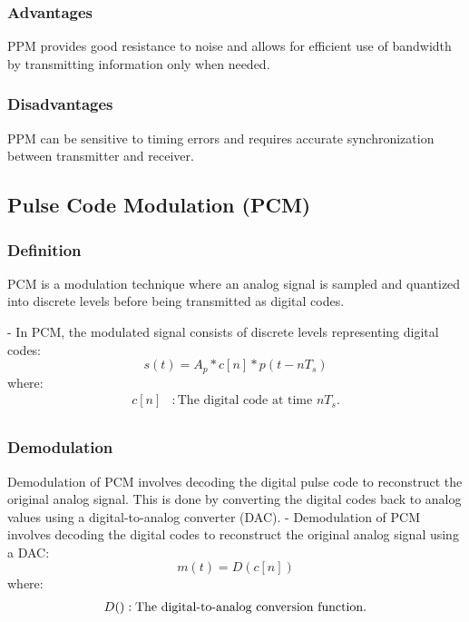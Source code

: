\documentclass{IEEEtran}
\begin{document}
	\subsubsection{Advantages}
	PPM provides good resistance to noise and allows for efficient use of bandwidth by transmitting information only when needed.
	
	\subsubsection{Disadvantages}
	PPM can be sensitive to timing errors and requires accurate synchronization between transmitter and receiver.
	
	\subsection{Pulse Code Modulation (PCM)}
	
	\subsubsection{Definition}
	PCM is a modulation technique where an analog signal is sampled and quantized into discrete levels before being transmitted as digital codes.
	
	 - In PCM, the modulated signal consists of discrete levels representing digital codes:
	\begin{equation}
		s(t) = A_p * c[n] * p(t - nT_s)
	\end{equation}
	where: \\
	\begin{align*}
		c[n]  & : \text{The digital code at time $nT_s$.} \\
	\end{align*}
	
	\subsubsection{Demodulation}
	 Demodulation of PCM involves decoding the digital pulse code to reconstruct the original analog signal. This is done by converting the digital codes back to analog values using a digital-to-analog converter (DAC).
	- Demodulation of PCM involves decoding the digital codes to reconstruct the original analog signal using a DAC:
	\begin{equation}
		m(t) = D({c[n]})
	\end{equation}
	where: \\
	\begin{align*}
		D({\space})  & : \text{The digital-to-analog conversion function.} \\
	\end{align*}
	
\end{document}
